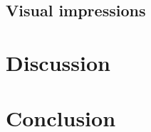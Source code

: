 \documentclass[11pt]{article}
\begin{document}
\subsection{Visual impressions}




\section{Discussion}


\section{Conclusion}



\end{document}
